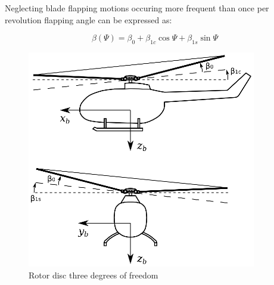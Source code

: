 Neglecting blade flapping motions occuring more frequent than once per revolution flapping angle can be expressed as:

\begin{equation}
\beta \left( \Psi \right)
=
\beta_0 + \beta_{1c} \cos \Psi + \beta_{1s} \sin \Psi 
\end{equation}

\begin{figure}[h!]
  \centering
  \includegraphics[width=100mm]{images/rotor_flapping_angles.eps}
  \caption{Rotor disc three degrees of freedom}
\end{figure}
